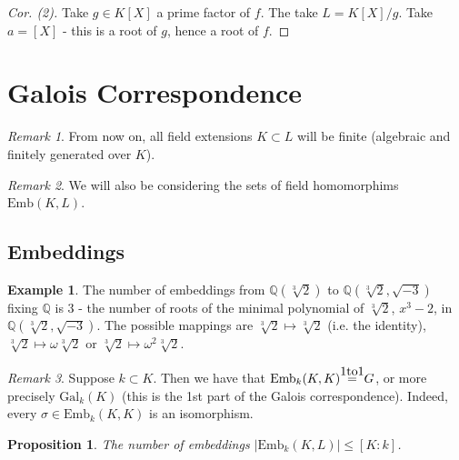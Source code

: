 \documentclass{article}
\theoremstyle{definition}
\newtheorem{exmp}{Example}[section]
\theoremstyle{plain}%
\newtheorem{prop}[thm]{Proposition}
\theoremstyle{remark}
\newtheorem*{rem}{Remark}
\newcommand{\Q}{\mathbb{Q}}
\newcommand{\Emb}{\text{Emb}}
\newcommand{\Gal}{\text{Gal}}
\newcommand{\onetoone}{\stackrel{\mathclap{\normalfont\mbox{1to1}}}{\;=\;}}
\begin{document}
\begin{proof}[Cor. (2)]
Take $g \in K[X]$ a prime factor of $f$. The take $L = K[X] / g$. Take $a = [X]$ - this is a root of $g$, hence a root of $f$.
\end{proof}

\section{Galois Correspondence}

\begin{rem}
From now on, all field extensions $K \subset L$ will be finite (algebraic and finitely generated over $K$).
\end{rem}

\begin{rem}
We will also be considering the sets of field homomorphims $\text{Emb}(K, L)$.
\end{rem}

\subsection{Embeddings}

\begin{exmp}
The number of embeddings from $\Q(\sqrt[3]{2})$ to $\Q(\sqrt[3]{2}, \sqrt{-3})$ fixing $\Q$ is 3 - the number of roots of the minimal polynomial of $\sqrt[3]{2}$, $x^3 - 2$, in $\Q(\sqrt[3]{2}, \sqrt{-3})$. The possible mappings are $\sqrt[3]{2} \mapsto \sqrt[3]{2}$ (i.e. the identity), $\sqrt[3]{2} \mapsto \omega\sqrt[3]{2}$ or $\sqrt[3]{2} \mapsto \omega^2\sqrt[3]{2}$.
\end{exmp}

\begin{rem}
Suppose $k \subset K$. Then we have that $\Emb_k(K, K) \onetoone G$, or more precisely $\Gal_k (K)$ (this is the 1st part of the Galois correspondence). Indeed, every $\sigma \in \Emb_k(K,K)$ is an isomorphism.
\end{rem}

\begin{prop}\label{prop 1}
The number of embeddings $|\Emb_k(K, L)| \le [K : k]$.
\end{prop}
\end{document}
